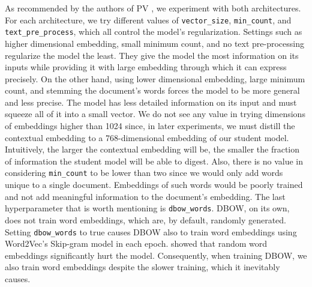 As recommended by the authors of PV \citep{le2014distributed}, we experiment
with both architectures. For each architecture, we try different values of
\texttt{vector\_size}, \texttt{min\_count}, and \texttt{text\_pre\_process},
which all control the model's regularization. Settings such as higher
dimensional embedding, small minimum count, and no text pre-processing
regularize the model the least. They give the model the most information on its
inputs while providing it with large embedding through which it
can express precisely. On the other hand, using lower dimensional embedding,
large minimum count, and stemming the document's words forces the model to be
more general and less precise. The model has less detailed information on its
input and must squeeze all of it into a small vector. We do not see any value in
trying dimensions of embeddings higher than 1024 since, in later experiments, we
must distill the contextual embedding to a 768-dimensional embedding of our
student model. Intuitively, the larger the contextual embedding will be,
the smaller the fraction of information the student model will be able
to digest. Also, there is no value in considering \texttt{min\_count} to be
lower than two since we would only add words unique to a single
document. Embeddings of such words would be poorly trained and not add
meaningful information to the document's embedding. The last hyperparameter that is
worth mentioning is \texttt{dbow\_words}. DBOW, on its own, does not train word
embeddings, which are, by default, randomly generated. Setting \texttt{dbow\_words} to true
causes DBOW also to train word embeddings using Word2Vec's Skip-gram model
\citep{mikolov2013efficient} in each epoch. \cite{lau2016empirical} showed that
random word embeddings significantly hurt the model. Consequently, when
training DBOW, we also train word embeddings despite the slower training, which
it inevitably causes.

